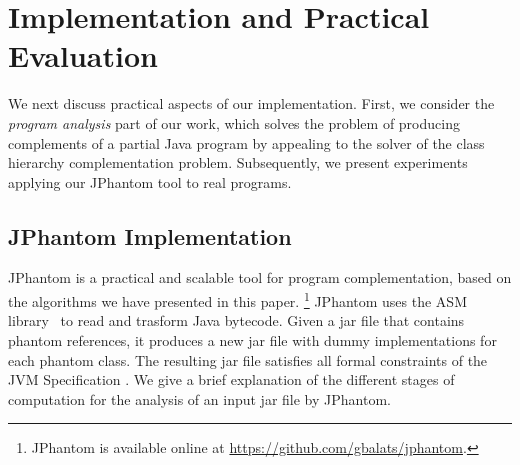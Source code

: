 \section{Implementation and Practical Evaluation}
\label{hiercomp/jphantom}

We next discuss practical aspects of our implementation. First, we
consider the \emph{program analysis} part of our work, which solves
the problem of producing complements of a partial Java program by
appealing to the solver of the class hierarchy complementation
problem. Subsequently, we present experiments applying our JPhantom
tool to real programs.

\subsection{JPhantom Implementation}

JPhantom is a practical and scalable tool for program complementation,
based on the algorithms we have presented in this
paper. \footnote{JPhantom is available online at
  \url{https://github.com/gbalats/jphantom}.} JPhantom uses the ASM
library~\cite{Bruneton2002asm} to read and trasform Java
bytecode. Given a jar file that contains phantom references, it
produces a new jar file with dummy implementations for each phantom
class. The resulting jar file satisfies all formal constraints of the
JVM Specification \cite{Lindholm:1999:JVM:553607}. We give a brief
explanation of the different stages of computation for the analysis of
an input jar file by JPhantom.


